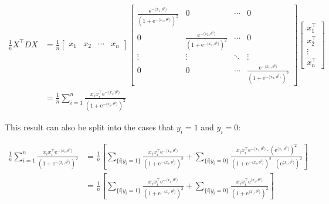 \documentclass{article}
\begin{document}
\begin{align*}
    \frac{1}{n}X^\intercal D X
    &= \frac{1}{n} \begin{bmatrix}
        x_1 & x_2 & \cdots & x_n
    \end{bmatrix}
    \begin{bmatrix}
        \frac{\mathrm{e}^{-\langle x_1, \theta^{\natural} \rangle}}{(1 + \mathrm{e}^{-\langle x_1, \theta^{\natural} \rangle})^2} & 0 & \cdots & 0 \\
        0 & \frac{\mathrm{e}^{-\langle x_2, \theta^{\natural} \rangle}}{(1 + \mathrm{e}^{-\langle x_2, \theta^{\natural} \rangle})^2} & \cdots & 0 \\
        \vdots & \vdots & \ddots & \vdots \\
        0 & 0 & \cdots & \frac{\mathrm{e}^{-\langle x_n, \theta^{\natural} \rangle}}{(1 + \mathrm{e}^{-\langle x_n, \theta^{\natural} \rangle})^2}
    \end{bmatrix}
    \begin{bmatrix}
        x_1^\intercal \\ x_2^\intercal \\ \vdots \\ x_n^\intercal
    \end{bmatrix} \\
    &= \frac{1}{n} \sum_{i = 1}^n \frac{x_i x_i^\intercal \mathrm{e}^{-\langle x_i, \theta^{\natural} \rangle}}{(1 + \mathrm{e}^{-\langle x_i, \theta^{\natural} \rangle})^2}
\end{align*}

This result can also be split into the cases that $y_i = 1$ and $y_i = 0$:

\begin{align*}
    \frac{1}{n} \sum_{i = 1}^n \frac{x_i x_i^\intercal \mathrm{e}^{-\langle x_i, \theta^{\natural} \rangle}}{(1 + \mathrm{e}^{-\langle x_i, \theta^{\natural} \rangle})^2}
    &= \frac{1}{n} \left[ \sum_{\{i | y_i = 1\}} \frac{x_i x_i^\intercal \mathrm{e}^{-\langle x_i, \theta^{\natural} \rangle}}{(1 + \mathrm{e}^{-\langle x_i, \theta^{\natural} \rangle})^2} +\sum_{\{i | y_i = 0\}} \frac{x_i x_i^\intercal \mathrm{e}^{-\langle x_i, \theta^{\natural} \rangle} \cdot (\mathrm{e}^{\langle x_i, \theta^{\natural} \rangle})^2}{(1 + \mathrm{e}^{-\langle x_i, \theta^{\natural} \rangle})^2 \cdot (\mathrm{e}^{\langle x_i, \theta^{\natural} \rangle})^2} \right]\\
    &= \frac{1}{n} \left[ \sum_{\{i | y_i = 1\}} \frac{x_i x_i^\intercal \mathrm{e}^{-\langle x_i, \theta^{\natural} \rangle}}{(1 + \mathrm{e}^{-\langle x_i, \theta^{\natural} \rangle})^2} +\sum_{\{i | y_i = 0\}} \frac{x_i x_i^\intercal \mathrm{e}^{\langle x_i, \theta^{\natural} \rangle}}{(1 + \mathrm{e}^{\langle x_i, \theta^{\natural} \rangle})^2} \right]
\end{align*}
\end{document}
